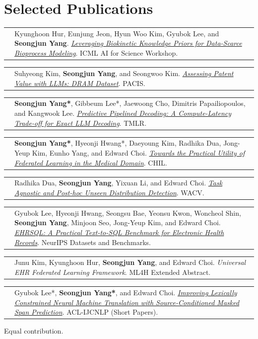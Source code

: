 \documentclass[10pt,letterpaper]{article}
\makeatletter
\newcommand{\publication}[2]{%
  \begin{tabularx}{\linewidth}{@{}l@{}>{\raggedright\arraybackslash\small}X@{}}
    \makebox[0.105\linewidth][l]{\small\color{muted}#1} & #2
  \end{tabularx}\par\vspace{7pt}
}
\makeatother
\begin{document}
\vspace{5pt}
\section*{Selected Publications}
\publication{2026}{Kyunghoon Hur, Eunjung Jeon, Hyun Woo Kim, Gyubok Lee, and \textbf{Seongjun Yang}. \href{https://arxiv.org/abs/2607.20539}{\textit{Leveraging Biokinetic Knowledge Priors for Data-Scarce Bioprocess Modeling}}. ICML AI for Science Workshop.}

\publication{2025}{Suhyeong Kim, \textbf{Seongjun Yang}, and Seongwoo Kim. \href{https://aisel.aisnet.org/pacis2025/aiandml/aiandml/2/}{\textit{Assessing Patent Value with LLMs: DRAM Dataset}}. PACIS.}

\publication{2024}{\textbf{Seongjun Yang*}, Gibbeum Lee*, Jaewoong Cho, Dimitris Papailiopoulos, and Kangwook Lee. \href{https://arxiv.org/abs/2307.05908}{\textit{Predictive Pipelined Decoding: A Compute-Latency Trade-off for Exact LLM Decoding}}. TMLR.}

\publication{2023}{\textbf{Seongjun Yang*}, Hyeonji Hwang*, Daeyoung Kim, Radhika Dua, Jong-Yeup Kim, Eunho Yang, and Edward Choi. \href{https://arxiv.org/abs/2110.09276}{\textit{Towards the Practical Utility of Federated Learning in the Medical Domain}}. CHIL.}

\publication{2023}{Radhika Dua, \textbf{Seongjun Yang}, Yixuan Li, and Edward Choi. \href{https://arxiv.org/abs/2207.13083}{\textit{Task Agnostic and Post-hoc Unseen Distribution Detection}}. WACV.}

\publication{2022}{Gyubok Lee, Hyeonji Hwang, Seongsu Bae, Yeonsu Kwon, Woncheol Shin, \textbf{Seongjun Yang}, Minjoon Seo, Jong-Yeup Kim, and Edward Choi. \href{https://proceedings.neurips.cc/paper_files/paper/2022/hash/643e347250cf9289e5a2a6c1ed5ee42e-Abstract-Datasets_and_Benchmarks.html}{\textit{EHRSQL: A Practical Text-to-SQL Benchmark for Electronic Health Records}}. NeurIPS Datasets and Benchmarks.}

\publication{2022}{Junu Kim, Kyunghoon Hur, \textbf{Seongjun Yang}, and Edward Choi. \textit{Universal EHR Federated Learning Framework}. ML4H Extended Abstract.}

\publication{2021}{Gyubok Lee*, \textbf{Seongjun Yang*}, and Edward Choi. \href{https://aclanthology.org/2021.acl-short.94/}{\textit{Improving Lexically Constrained Neural Machine Translation with Source-Conditioned Masked Span Prediction}}. ACL-IJCNLP (Short Papers).}

{\small * Equal contribution.}
\end{document}
